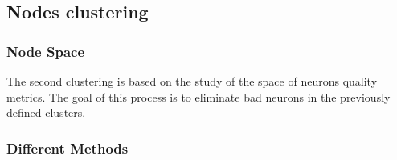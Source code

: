 \documentclass[11pt,a4paper]{report}
\begin{document}
\begin{multicols}{2}
    \chapter{Nodes clustering}

    \subsection{Node Space}
    The second clustering is based on the study of the space of neurons quality metrics. The goal of this process is to eliminate bad neurons in the previously defined clusters.



    \subsection{Different Methods}

\end{multicols}
\end{document}
